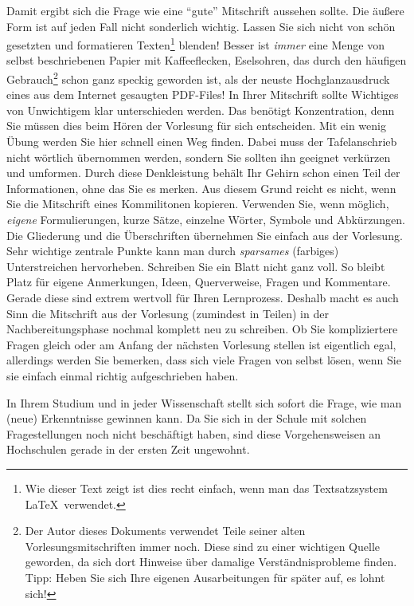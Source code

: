 Damit ergibt sich die Frage wie eine "`gute"' Mitschrift aussehen sollte. Die äußere Form ist
auf jeden Fall nicht sonderlich wichtig. Lassen Sie sich nicht von schön gesetzten und formatieren
Texten\footnote{Wie dieser Text zeigt ist dies recht einfach, wenn man das Textsatzsystem
\LaTeX\ verwendet.} blenden! Besser ist \emph{immer} eine Menge von selbst beschriebenen Papier 
mit Kaffeeflecken, Eselsohren, das durch den häufigen Gebrauch\footnote{Der Autor dieses Dokuments 
verwendet Teile seiner alten Vorlesungsmitschriften immer noch. Diese sind zu einer wichtigen Quelle 
geworden, da sich dort Hinweise über damalige Verständnisprobleme finden. Tipp: Heben Sie sich Ihre 
eigenen Ausarbeitungen für später auf, es lohnt sich!} schon ganz speckig geworden ist, als der neuste 
Hochglanzausdruck eines aus dem Internet gesaugten PDF-Files! In Ihrer Mitschrift sollte Wichtiges 
von Unwichtigem klar unterschieden werden. Das benötigt Konzentration, denn Sie müssen dies beim 
Hören der  Vorlesung für sich entscheiden. Mit ein wenig Übung werden Sie hier schnell einen Weg 
finden. Dabei muss der Tafelanschrieb nicht wörtlich übernommen werden, sondern Sie sollten ihn 
geeignet  verkürzen und umformen. Durch diese Denkleistung behält Ihr Gehirn schon einen Teil der 
Informationen, ohne das Sie es merken. Aus diesem Grund reicht es nicht, wenn Sie 
die Mitschrift eines Kommilitonen kopieren. Verwenden Sie, wenn möglich, \emph{eigene}
Formulierungen, kurze Sätze, einzelne Wörter, Symbole und Abkürzungen. Die Gliederung
und die Überschriften übernehmen Sie einfach aus der Vorlesung. Sehr wichtige zentrale
Punkte kann man durch \emph{sparsames} (farbiges) Unterstreichen hervorheben. Schreiben
Sie ein Blatt nicht ganz voll. So bleibt Platz für eigene Anmerkungen, Ideen, Querverweise,
Fragen und Kommentare. Gerade diese sind extrem wertvoll für Ihren Lernprozess.  
Deshalb macht es auch Sinn die Mitschrift aus der Vorlesung (zumindest in Teilen) in der 
Nachbereitungsphase nochmal komplett neu zu schreiben. Ob Sie kompliziertere Fragen gleich oder 
am Anfang der nächsten Vorlesung stellen ist eigentlich egal, allerdings werden Sie bemerken, dass 
sich viele Fragen  von selbst lösen, wenn Sie sie einfach einmal richtig aufgeschrieben haben.

\bigskip

In Ihrem Studium und in jeder Wissenschaft stellt sich sofort die Frage, wie man (neue)
Erkenntnisse gewinnen kann.  Da Sie sich in der Schule mit solchen Fragestellungen
noch nicht beschäftigt haben, sind diese Vorgehensweisen an Hochschulen gerade in der 
ersten Zeit ungewohnt. 

